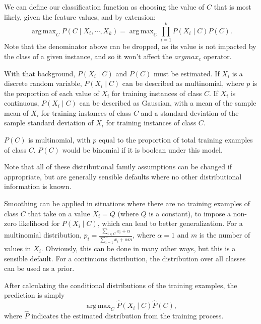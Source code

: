 \documentclass{amsart}
\DeclareMathOperator*{\argmax}{arg\,max}
\begin{document}
    We can define our classification function as choosing the value of $C$ that is most likely, given
    the feature values, and by extension:
    \[
        \argmax_C P(C \mid X_i, \cdots, X_k) = \argmax_C \prod_{i=1}^k P(X_i \mid C) P(C).
    \]
    Note that the denominator above can be dropped, as its value is not impacted by the class
    of a given instance, and so it won't affect the $argmax_c$ operator.

    With that background, $P(X_i \mid C)$ and $P(C)$ must be estimated.
    If $X_i$ is a discrete random variable, $P(X_i \mid C)$ can be described as multinomial,
    where $p$ is the proportion of each value of $X_i$ for training instances of class $C$.
    If $X_i$ is continuous, $P(X_i \mid C)$ can be described as Gaussian, with a mean of the sample
    mean of $X_i$ for training instances of class $C$ and a standard deviation of the sample
    standard deviation of $X_i$ for training instances of class $C$.

    $P(C)$ is multinomial, with $p$ equal to the proportion of total training
    examples of class $C$. $P(C)$ would be binomial if it is boolean under this model.

    Note that all of these distributional family assumptions can be changed if appropriate, but
    are generally sensible defaults where no other distributional information is known.

    Smoothing can be applied in situations where there are no training examples of class $C$ that take
    on a value $X_i = Q$ (where $Q$ is a constant), to impose a non-zero likelihood for $P(X_i \mid C)$,
    which can lead to better generalization.
    For a multinomial distribution, $p_i = \frac{\sum_{i \in C} x_i + \alpha}{\sum_{i=1}^n x_i + \alpha m}$,
    where $\alpha=1$ and $m$ is the number of values in $X_i$. Obviously, this can be done in many other ways,
    but this is a sensible default. For a continuous distribution, the distribution over all classes can
    be used as a prior.

    After calculating the conditional distributions of the training examples, the prediction is
    simply
    \[
        \argmax_C \hat{P}(X_i \mid C) \hat{P}(C),
    \]
    where $\hat{P}$ indicates the estimated distribution from the training process.
\end{document}
